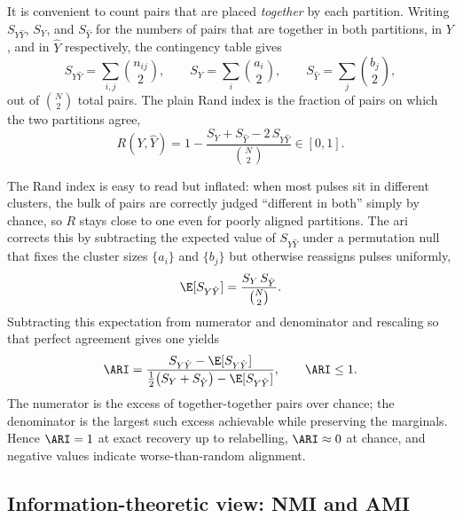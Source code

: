 It is convenient to count pairs that are placed \emph{together} by each partition.
Writing $S_{Y\hat{Y}}$, $S_Y$, and $S_{\hat{Y}}$ for the numbers of pairs that are together in both partitions, in $Y$, and in $\hat{Y}$ respectively, the contingency table gives
\begin{equation}\label{eq:method:pair_counts}
  S_{Y\hat{Y}}=\sum_{i,j}\binom{n_{ij}}{2},\qquad
  S_Y=\sum_i\binom{a_i}{2},\qquad
  S_{\hat{Y}}=\sum_j\binom{b_j}{2},
\end{equation}
out of $\binom{N}{2}$ total pairs.
The plain Rand index \parencite{hubert1985comparing} is the fraction of pairs on which the two partitions agree,
\begin{equation}\label{eq:method:rand}
  R(Y,\hat{Y})
  =
  1 - \frac{S_Y + S_{\hat{Y}} - 2\,S_{Y\hat{Y}}}{\binom{N}{2}}
  \in[0,1].
\end{equation}

The Rand index is easy to read but inflated: when most pulses sit in different clusters, the bulk of pairs are correctly judged ``different in both'' simply by chance, so $R$ stays close to one even for poorly aligned partitions.
The \gls{ari} \parencite{hubert1985comparing} corrects this by subtracting the expected value of $S_{Y\hat{Y}}$ under a permutation null that fixes the cluster sizes $\{a_i\}$ and $\{b_j\}$ but otherwise reassigns pulses uniformly,
\begin{equation}\label{eq:method:ari_expected}
  \E[S_{Y\hat{Y}}]
  =
  \frac{S_Y\,S_{\hat{Y}}}{\binom{N}{2}}.
\end{equation}
Subtracting this expectation from numerator and denominator and rescaling so that perfect agreement gives one yields
\begin{equation}\label{eq:method:ari}
  \ARI
  =
  \frac{S_{Y\hat{Y}}-\E[S_{Y\hat{Y}}]}{\tfrac{1}{2}\bigl(S_Y+S_{\hat{Y}}\bigr)-\E[S_{Y\hat{Y}}]},
  \qquad
  \ARI\le 1.
\end{equation}
The numerator is the excess of together-together pairs over chance; the denominator is the largest such excess achievable while preserving the marginals.
Hence $\ARI=1$ at exact recovery up to relabelling, $\ARI\approx 0$ at chance, and negative values indicate worse-than-random alignment.

\subsection*{Information-theoretic view: NMI and AMI}

